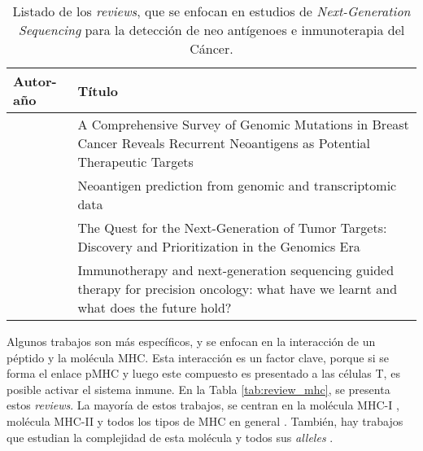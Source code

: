 \begin{table}[H]
		\caption{Listado de los \textit{reviews}, que se enfocan en estudios de \textit{Next-Generation Sequencing} para la detección de neo antígenoes e inmunoterapia del Cáncer.}
	\label{tab:review_seq}
	\begin{tabular}{p{3cm}p{10cm}}
	\textbf{Autor-año }                            & \textbf{Título}                                                                                                                                \\ \hline
		\cite{zhou2022comprehensive}     & A Comprehensive Survey of Genomic Mutations in Breast Cancer Reveals Recurrent Neoantigens as Potential Therapeutic Targets            \\
		\cite{battaglia2020neoantigen}   & Neoantigen prediction from genomic and transcriptomic data                                                                             \\
		\cite{mirandola2020quest}        & The Quest for the Next-Generation of Tumor Targets: Discovery and Prioritization in the Genomics Era                                   \\		
		\cite{groisberg2018immunotherapy}& Immunotherapy and next-generation sequencing guided therapy for precision oncology: what have we learnt and what does the future hold?
	\end{tabular}
\end{table}

Algunos trabajos son más específicos, y se enfocan en la interacción de un péptido y la molécula MHC. Esta interacción es un factor clave, porque si se forma el enlace pMHC y luego este compuesto es presentado a las células T, es posible activar el sistema inmune. En la Tabla \ref{tab:review_mhc}, se presenta estos \textit{reviews}. La mayoría de estos trabajos, se centran en la molécula MHC-I \citep{mateo2020comparison, mei2020comprehensive, schmidt2019mhc, mei2020comprehensive} , molécula MHC-II \citep{jensen2018improved} y todos los tipos de MHC en general \citep{nielsen2020immunoinformatics, liu2020review, liu2020review}. También, hay trabajos que estudian la complejidad de esta molécula y todos sus \textit{alleles} \citep{radwan2020advances}.



